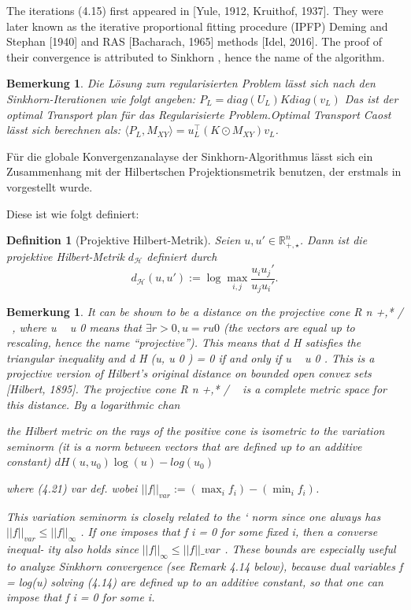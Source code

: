 \documentclass[11pt,a4paper]{article}
\newtheorem{definition}[theorem]{Definition}
\newtheorem{remark}[theorem]{Bemerkung}
\numberwithin{equation}{section}
\begin{document}
		The iterations (4.15) first appeared in [Yule, 1912,
		Kruithof, 1937]. They were later known as the iterative proportional fitting procedure
		(IPFP) Deming and Stephan [1940] and RAS [Bacharach, 1965] methods [Idel, 2016].
		The proof of their convergence is attributed to Sinkhorn \cite{sinkhorn1964relationship}, hence the name of the
		algorithm.
		
		
		
	\begin{remark}
	Die Lösung zum regularisierten Problem lässt sich nach den Sinkhorn-Iterationen wie folgt angeben: $P_L = diag(U_L)K diag(v_L)$ Das ist  der optimal Transport plan für das Regularisierte Problem.Optimal Transport Caost lässt sich berechnen als:
$\langle P_L, M_{XY}\rangle = u_L ^\top ( K \odot M_{XY})v_L$.	\end{remark}	
	
	
		Für die globale Konvergenzanalayse der Sinkhorn-Algorithmus lässt sich ein Zusammenhang mit der Hilbertschen Projektionsmetrik benutzen, der erstmals in \cite{franklin_sinkhorn_convergence} vorgestellt wurde.
		
		Diese ist wie folgt definiert:
		
		\begin{definition}[Projektive Hilbert-Metrik]
			Seien $u,u' \in \mathbb{R}_{+,\star}^n$.
			Dann ist die projektive Hilbert-Metrik $d_\mathcal{H}$ definiert durch
			\begin{equation}
				d_\mathcal{H}(u,u') := \log \max_{i,j}{\frac{u_iu_j'}{u_ju_i'}}.
			\end{equation}
		\end{definition}
		
		\begin{remark}
			It can be shown to be a distance on the projective cone R n +,* / ~, where u ~ u 0
			means that $\exists r > 0, u = ru 0$ (the vectors are equal up to rescaling, hence the
			name “projective”). This means that d H satisfies the triangular inequality and
			d H (u, u 0 ) = 0 if and only if u ~ u 0 . This is a projective version of Hilbert’s original
			distance on bounded open convex sets [Hilbert, 1895]. The projective cone R n +,* / ~
			is a complete metric space for this distance. By a logarithmic chan
			
			the Hilbert metric on the rays of the positive cone is isometric to the variation
			seminorm (it is a norm between vectors that are defined up to an additive constant)
			$dH(u,u_0) \log (u) -log(u_0)$
			
			where
			(4.21)
			var
			def.
			wobei $||f||_{var} := (\max_i f_i) -(\min_i f_i)$.
		
			This variation seminorm is closely related to the ` norm since one always has
			$||f||_{var} \leq ||f||_{\infty}$  . If one imposes that f i = 0 for some fixed i, then a converse inequal-
			ity also holds since $||f||_{\infty} \leq ||f||\_{var}$ . These bounds are especially useful to analyze
			Sinkhorn convergence (see Remark 4.14 below), because dual variables f = log(u)
			solving (4.14) are defined up to an additive constant, so that one can impose that
			f i = 0 for some i. 
		\end{remark}
		
\end{document}
